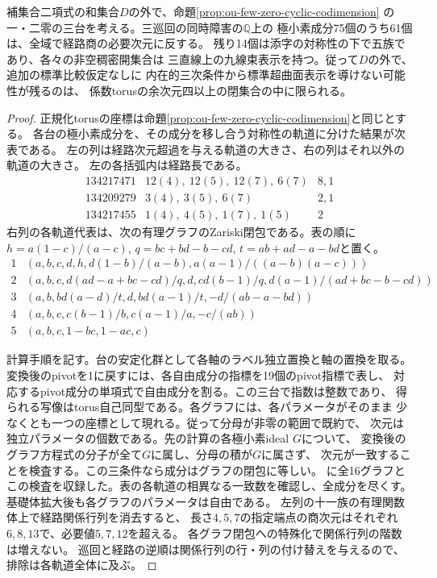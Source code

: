 \begin{theorem}[一・二零の五族と余次元四]
\label{thm:ou-one-two-zero-graphs}
補集合二項式の和集合$D$の外で、命題\ref{prop:ou-few-zero-cyclic-codimension}
の一・二零の三台を考える。三巡回の同時障害の$\mathbb Q$上の
極小素成分75個のうち61個は、全域で経路商の必要次元に反する。
残り14個は添字の対称性の下で五族であり、各々の非空稠密開集合は
三直線上の九線束表示を持つ。従って$D$の外で、追加の標準比較仮定なしに
内在的三次条件から標準超曲面表示を導けない可能性が残るのは、
係数torusの余次元四以上の閉集合の中に限られる。
\end{theorem}
\begin{proof}
正規化torusの座標は命題\ref{prop:ou-few-zero-cyclic-codimension}と同じとする。
各台の極小素成分を、その成分を移し合う対称性の軌道に分けた結果が次表である。
左の列は経路次元超過を与える軌道の大きさ、右の列はそれ以外の軌道の大きさ。
左の各括弧内は経路長である。
\[
\begin{array}{r|l|l}
134217471&12(4),\ 12(5),\ 12(7),\ 6(7)&8,1\\
134209279&3(4),\ 3(5),\ 6(7)&2,1\\
134217455&1(4),\ 4(5),\ 1(7),\ 1(5)&2
\end{array}
\]
右列の各軌道代表は、次の有理グラフのZariski閉包である。表の順に
$h=a(1-c)/(a-c)$, $q=bc+bd-b-cd$, $t=ab+ad-a-bd$と置く。
\[
\begin{array}{c|l}
1&(a,b,c,d,h,d(1-b)/(a-b),a(a-1)/((a-b)(a-c)))\\
2&(a,b,c,d(ad-a+bc-cd)/q,d,cd(b-1)/q,d(a-1)/(ad+bc-b-cd))\\
3&(a,b,bd(a-d)/t,d,bd(a-1)/t,-d/(ab-a-bd))\\
4&(a,b,c,c(b-1)/b,c(a-1)/a,-c/(ab))\\
5&(a,b,c,1-bc,1-ac,c)
\end{array}
\]

計算手順を記す。台の安定化群として各軸のラベル独立置換と軸の置換を取る。
変換後のpivotを1に戻すには、各自由成分の指標を19個のpivot指標で表し、
対応するpivot成分の単項式で自由成分を割る。この三台で指数は整数であり、
得られる写像はtorus自己同型である。各グラフには、各パラメータがそのまま
少なくとも一つの座標として現れる。従って分母が非零の範囲で既約で、
次元は独立パラメータの個数である。先の計算の各極小素ideal $G$について、
変換後のグラフ方程式の分子が全て$G$に属し、分母の積が$G$に属さず、
次元が一致することを検査する。この三条件なら成分はグラフの閉包に等しい。
に全16グラフと
この検査を収録した。表の各軌道の相異なる一致数を確認し、全成分を尽くす。
基礎体拡大後も各グラフのパラメータは自由である。
左列の十一族の有理関数体上で経路関係行列を消去すると、
長さ$4,5,7$の指定端点の商次元はそれぞれ$6,8,13$で、必要値$5,7,12$を超える。
各グラフ閉包への特殊化で関係行列の階数は増えない。
巡回と経路の逆順は関係行列の行・列の付け替えを与えるので、
排除は各軌道全体に及ぶ。


\end{proof}
